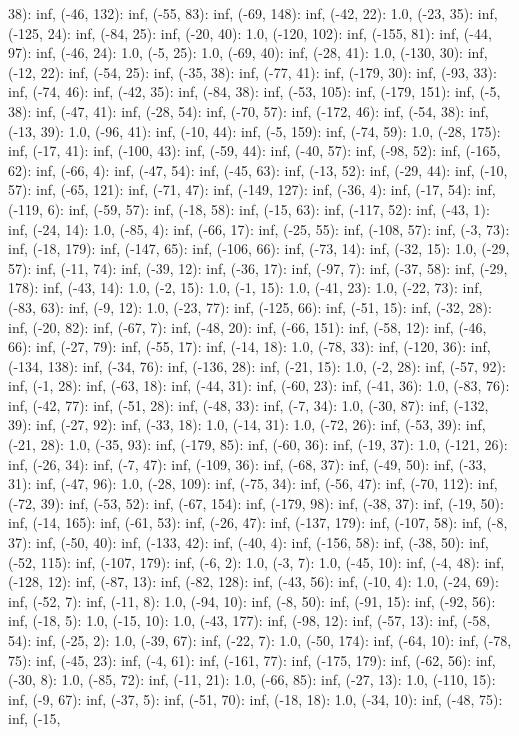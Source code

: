 \documentclass[parskip=half]{scrartcl}
\begin{document}
38): inf, (-46, 132): inf, (-55, 83): inf, (-69, 148): inf, (-42, 22): 1.0, (-23, 35): inf, (-125, 24): inf, (-84, 25): inf, (-20, 40): 1.0, (-120, 102): inf, (-155, 81): inf, (-44, 97): inf, (-46, 24): 1.0, (-5, 25): 1.0, (-69, 40): inf, (-28, 41): 1.0, (-130, 30): inf, (-12, 22): inf, (-54, 25): inf, (-35, 38): inf, (-77, 41): inf, (-179, 30): inf, (-93, 33): inf, (-74, 46): inf, (-42, 35): inf, (-84, 38): inf, (-53, 105): inf, (-179, 151): inf, (-5, 38): inf, (-47, 41): inf, (-28, 54): inf, (-70, 57): inf, (-172, 46): inf, (-54, 38): inf, (-13, 39): 1.0, (-96, 41): inf, (-10, 44): inf, (-5, 159): inf, (-74, 59): 1.0, (-28, 175): inf, (-17, 41): inf, (-100, 43): inf, (-59, 44): inf, (-40, 57): inf, (-98, 52): inf, (-165, 62): inf, (-66, 4): inf, (-47, 54): inf, (-45, 63): inf, (-13, 52): inf, (-29, 44): inf, (-10, 57): inf, (-65, 121): inf, (-71, 47): inf, (-149, 127): inf, (-36, 4): inf, (-17, 54): inf, (-119, 6): inf, (-59, 57): inf, (-18, 58): inf, (-15, 63): inf, (-117, 52): inf, (-43, 1): inf, (-24, 14): 1.0, (-85, 4): inf, (-66, 17): inf, (-25, 55): inf, (-108, 57): inf, (-3, 73): inf, (-18, 179): inf, (-147, 65): inf, (-106, 66): inf, (-73, 14): inf, (-32, 15): 1.0, (-29, 57): inf, (-11, 74): inf, (-39, 12): inf, (-36, 17): inf, (-97, 7): inf, (-37, 58): inf, (-29, 178): inf, (-43, 14): 1.0, (-2, 15): 1.0, (-1, 15): 1.0, (-41, 23): 1.0, (-22, 73): inf, (-83, 63): inf, (-9, 12): 1.0, (-23, 77): inf, (-125, 66): inf, (-51, 15): inf, (-32, 28): inf, (-20, 82): inf, (-67, 7): inf, (-48, 20): inf, (-66, 151): inf, (-58, 12): inf, (-46, 66): inf, (-27, 79): inf, (-55, 17): inf, (-14, 18): 1.0, (-78, 33): inf, (-120, 36): inf, (-134, 138): inf, (-34, 76): inf, (-136, 28): inf, (-21, 15): 1.0, (-2, 28): inf, (-57, 92): inf, (-1, 28): inf, (-63, 18): inf, (-44, 31): inf, (-60, 23): inf, (-41, 36): 1.0, (-83, 76): inf, (-42, 77): inf, (-51, 28): inf, (-48, 33): inf, (-7, 34): 1.0, (-30, 87): inf, (-132, 39): inf, (-27, 92): inf, (-33, 18): 1.0, (-14, 31): 1.0, (-72, 26): inf, (-53, 39): inf, (-21, 28): 1.0, (-35, 93): inf, (-179, 85): inf, (-60, 36): inf, (-19, 37): 1.0, (-121, 26): inf, (-26, 34): inf, (-7, 47): inf, (-109, 36): inf, (-68, 37): inf, (-49, 50): inf, (-33, 31): inf, (-47, 96): 1.0, (-28, 109): inf, (-75, 34): inf, (-56, 47): inf, (-70, 112): inf, (-72, 39): inf, (-53, 52): inf, (-67, 154): inf, (-179, 98): inf, (-38, 37): inf, (-19, 50): inf, (-14, 165): inf, (-61, 53): inf, (-26, 47): inf, (-137, 179): inf, (-107, 58): inf, (-8, 37): inf, (-50, 40): inf, (-133, 42): inf, (-40, 4): inf, (-156, 58): inf, (-38, 50): inf, (-52, 115): inf, (-107, 179): inf, (-6, 2): 1.0, (-3, 7): 1.0, (-45, 10): inf, (-4, 48): inf, (-128, 12): inf, (-87, 13): inf, (-82, 128): inf, (-43, 56): inf, (-10, 4): 1.0, (-24, 69): inf, (-52, 7): inf, (-11, 8): 1.0, (-94, 10): inf, (-8, 50): inf, (-91, 15): inf, (-92, 56): inf, (-18, 5): 1.0, (-15, 10): 1.0, (-43, 177): inf, (-98, 12): inf, (-57, 13): inf, (-58, 54): inf, (-25, 2): 1.0, (-39, 67): inf, (-22, 7): 1.0, (-50, 174): inf, (-64, 10): inf, (-78, 75): inf, (-45, 23): inf, (-4, 61): inf, (-161, 77): inf, (-175, 179): inf, (-62, 56): inf, (-30, 8): 1.0, (-85, 72): inf, (-11, 21): 1.0, (-66, 85): inf, (-27, 13): 1.0, (-110, 15): inf, (-9, 67): inf, (-37, 5): inf, (-51, 70): inf, (-18, 18): 1.0, (-34, 10): inf, (-48, 75): inf, (-15, 
\end{document}
